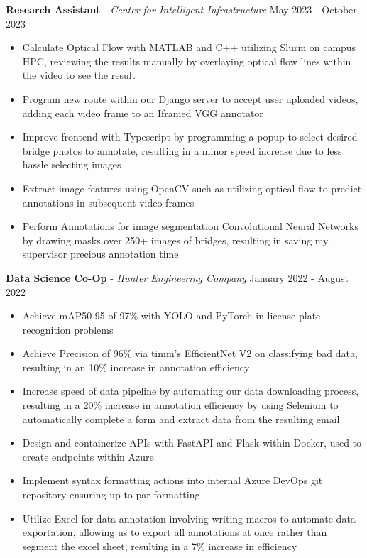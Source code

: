 \documentclass[11pt]{article}
\begin{document}
\textbf{Research Assistant} - \textsl{Center for Intelligent Infrastructure} \hfill May 2023 - October 2023
\begin{itemize}[noitemsep, topsep=0pt, partopsep=0pt, parsep=0pt, itemsep=0pt]
    \item Calculate Optical Flow with MATLAB and C++ utilizing Slurm on campus HPC, reviewing the results manually by overlaying optical flow lines within the video to see the result
    \item Program new route within our Django server to accept user uploaded videos, adding each video frame to an Iframed VGG annotator
    \item Improve frontend with Typescript by programming a popup to select desired bridge photos to annotate, resulting in a minor speed increase due to less hassle selecting images
    \item Extract image features using OpenCV such as utilizing optical flow to predict annotations in subsequent video frames
    \item Perform Annotations for image segmentation Convolutional Neural Networks by drawing masks over 250+ images of bridges, resulting in saving my supervisor precious annotation time
\end{itemize}


\textbf{Data Science Co-Op} - \textsl{Hunter Engineering Company} \hfill January 2022 - August 2022
\begin{itemize}[noitemsep, topsep=0pt, partopsep=0pt, parsep=0pt, itemsep=0pt]
    \item Achieve mAP50-95 of 97\% with YOLO and PyTorch in license plate recognition problems
    \item Achieve Precision of 96\% via timm's EfficientNet V2 on classifying bad data, resulting in an 10\% increase in annotation efficiency
    \item Increase speed of data pipeline by automating our data downloading process, resulting in a 20\% increase in annotation efficiency by using Selenium to automatically complete a form and extract data from the resulting email
    \item Design and containerize APIs with FastAPI and Flask within Docker, used to create endpoints within Azure
    \item Implement syntax formatting actions into internal Azure DevOps git repository ensuring up to par formatting
    \item Utilize Excel for data annotation involving writing macros to automate data exportation, allowing us to export all annotations at once rather than segment the excel sheet, resulting in a 7\% increase in efficiency
\end{itemize}
\end{document}
